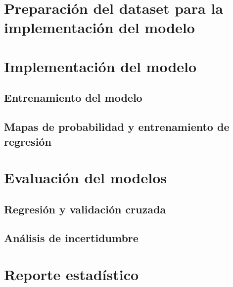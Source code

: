 \section{Preparación del dataset para la implementación del modelo}

\section{Implementación del modelo}
\subsection{Entrenamiento del modelo}
\subsection{Mapas de probabilidad y entrenamiento de regresión}

\section{Evaluación del modelos}
	\subsection{Regresión y validación cruzada}
	\subsection{Análisis de incertidumbre}


\section{Reporte estadístico}